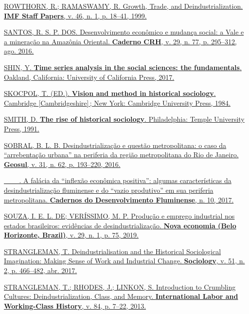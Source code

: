 \href{https://www.zotero.org/google-docs/?p3HTgZ}{ROWTHORN, R.;
RAMASWAMY, R. Growth, Trade, and Deindustrialization. \textbf{IMF Staff
Papers}, v. 46, n. 1, p. 18--41, 1999.}

\href{https://www.zotero.org/google-docs/?p3HTgZ}{SANTOS, R. S. P. DOS.
Desenvolvimento econômico e mudança social: a Vale e a mineração na
Amazônia Oriental. \textbf{Caderno CRH}, v. 29, n. 77, p. 295--312, ago.
2016.}

\href{https://www.zotero.org/google-docs/?p3HTgZ}{SHIN, Y. \textbf{Time
series analysis in the social sciences: the fundamentals}. Oakland,
California: University of California Press, 2017.}

\href{https://www.zotero.org/google-docs/?p3HTgZ}{SKOCPOL, T. (ED.).
\textbf{Vision and method in historical sociology}. Cambridge
{[}Cambridgeshire{]}\,; New York: Cambridge University Press, 1984.}

\href{https://www.zotero.org/google-docs/?p3HTgZ}{SMITH, D. \textbf{The
rise of historical sociology}. Philadelphia: Temple University Press,
1991.}

\href{https://www.zotero.org/google-docs/?p3HTgZ}{SOBRAL, B. L. B.
Desindustrialização e questão metropolitana: o caso da ``arrebentação
urbana'' na periferia da região metropolitana do Rio de Janeiro.
\textbf{Geosul}, v. 31, n. 62, p. 193--220, 2016.}

\href{https://www.zotero.org/google-docs/?p3HTgZ}{\_\_\_. A falácia da
``inflexão econômica positiva'': algumas características da
desindustrialização fluminense e do ``vazio produtivo'' em sua periferia
metropolitana. \textbf{Cadernos do Desenvolvimento Fluminense}, n. 10,
2017.}

\href{https://www.zotero.org/google-docs/?p3HTgZ}{SOUZA, I. E. L. DE;
VERÍSSIMO, M. P. Produção e emprego industrial nos estados brasileiros:
evidências de desindustrialização. \textbf{Nova economia (Belo
Horizonte, Brazil)}, v. 29, n. 1, p. 75, 2019.}

\href{https://www.zotero.org/google-docs/?p3HTgZ}{STRANGLEMAN, T.
Deindustrialisation and the Historical Sociological Imagination: Making
Sense of Work and Industrial Change. \textbf{Sociology}, v. 51, n. 2, p.
466--482, abr. 2017.}

\href{https://www.zotero.org/google-docs/?p3HTgZ}{STRANGLEMAN, T.;
RHODES, J.; LINKON, S. Introduction to Crumbling Cultures:
Deindustrialization, Class, and Memory. \textbf{International Labor and
Working-Class History}, v. 84, p. 7--22, 2013.}

